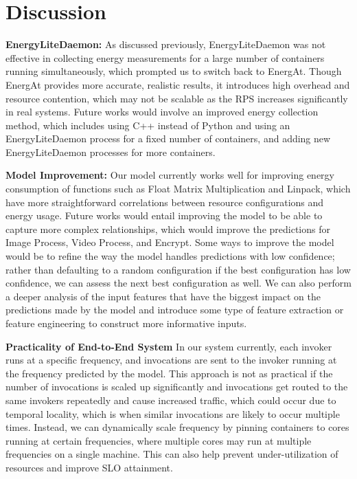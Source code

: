 \documentclass[times, 10pt,twocolumn]{article}
\begin{document}
\section{Discussion}
\textbf{EnergyLiteDaemon:} As discussed previously, EnergyLiteDaemon was not effective in collecting energy measurements for a large number of containers running simultaneously, which prompted us to switch back to EnergAt. Though EnergAt provides more accurate, realistic results, it introduces high overhead and resource contention, which may not be scalable as the RPS increases significantly in real systems. Future works would involve an improved energy collection method, which includes using C++ instead of Python and using an EnergyLiteDaemon process for a fixed number of containers, and adding new EnergyLiteDaemon processes for more containers. 

\textbf{Model Improvement:} Our model currently works well for improving energy consumption of functions such as Float Matrix Multiplication and Linpack, which have more straightforward correlations between resource configurations and energy usage. Future works would entail improving the model to be able to capture more complex relationships, which would improve the predictions for Image Process, Video Process, and Encrypt. Some ways to improve the model would be to refine the way the model handles predictions with low confidence; rather than defaulting to a random configuration if the best configuration has low confidence, we can assess the next best configuration as well. We can also perform a deeper analysis of the input features that have the biggest impact on the predictions made by the model and introduce some type of feature extraction or feature engineering to construct more informative inputs. 

\textbf{Practicality of End-to-End System} In our system currently, each invoker runs at a specific frequency, and invocations are sent to the invoker running at the frequency predicted by the model. This approach is not as practical if the number of invocations is scaled up significantly and invocations get routed to the same invokers repeatedly and cause increased traffic, which could occur due to temporal locality, which is when similar invocations are likely to occur multiple times. Instead, we can dynamically scale frequency by pinning containers to cores running at certain frequencies, where multiple cores may run at multiple frequencies on a single machine. This can also help prevent under-utilization of resources and improve SLO attainment.
\end{document}
